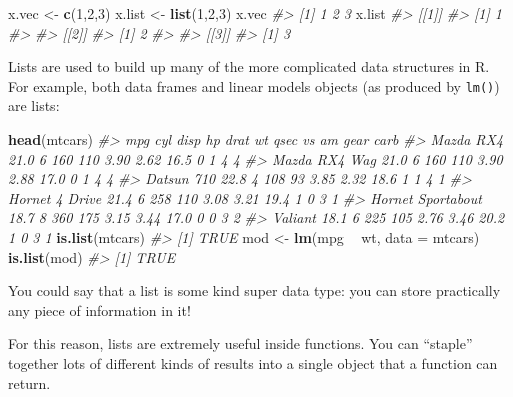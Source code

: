 \documentclass[]{book}
\newenvironment{Shaded}{\begin{snugshade}}{\end{snugshade}}
\newcommand{\CommentTok}[1]{\textcolor[rgb]{0.56,0.35,0.01}{\textit{#1}}}
\newcommand{\DataTypeTok}[1]{\textcolor[rgb]{0.13,0.29,0.53}{#1}}
\newcommand{\DecValTok}[1]{\textcolor[rgb]{0.00,0.00,0.81}{#1}}
\newcommand{\KeywordTok}[1]{\textcolor[rgb]{0.13,0.29,0.53}{\textbf{#1}}}
\newcommand{\NormalTok}[1]{#1}
\newcommand{\OperatorTok}[1]{\textcolor[rgb]{0.81,0.36,0.00}{\textbf{#1}}}
\newcommand{\StringTok}[1]{\textcolor[rgb]{0.31,0.60,0.02}{#1}}
\begin{document}
\begin{Shaded}
\begin{Highlighting}[]
\NormalTok{x.vec <-}\StringTok{ }\KeywordTok{c}\NormalTok{(}\DecValTok{1}\NormalTok{,}\DecValTok{2}\NormalTok{,}\DecValTok{3}\NormalTok{)}
\NormalTok{x.list <-}\StringTok{ }\KeywordTok{list}\NormalTok{(}\DecValTok{1}\NormalTok{,}\DecValTok{2}\NormalTok{,}\DecValTok{3}\NormalTok{)}
\NormalTok{x.vec}
\CommentTok{#> [1] 1 2 3}
\NormalTok{x.list}
\CommentTok{#> [[1]]}
\CommentTok{#> [1] 1}
\CommentTok{#> }
\CommentTok{#> [[2]]}
\CommentTok{#> [1] 2}
\CommentTok{#> }
\CommentTok{#> [[3]]}
\CommentTok{#> [1] 3}
\end{Highlighting}
\end{Shaded}

Lists are used to build up many of the more complicated data structures in R. For example, both data frames and linear models objects (as produced by \texttt{lm()}) are lists:

\begin{Shaded}
\begin{Highlighting}[]
\KeywordTok{head}\NormalTok{(mtcars)}
\CommentTok{#>                    mpg cyl disp  hp drat   wt qsec vs am gear carb}
\CommentTok{#> Mazda RX4         21.0   6  160 110 3.90 2.62 16.5  0  1    4    4}
\CommentTok{#> Mazda RX4 Wag     21.0   6  160 110 3.90 2.88 17.0  0  1    4    4}
\CommentTok{#> Datsun 710        22.8   4  108  93 3.85 2.32 18.6  1  1    4    1}
\CommentTok{#> Hornet 4 Drive    21.4   6  258 110 3.08 3.21 19.4  1  0    3    1}
\CommentTok{#> Hornet Sportabout 18.7   8  360 175 3.15 3.44 17.0  0  0    3    2}
\CommentTok{#> Valiant           18.1   6  225 105 2.76 3.46 20.2  1  0    3    1}
\KeywordTok{is.list}\NormalTok{(mtcars)}
\CommentTok{#> [1] TRUE}
\NormalTok{mod <-}\StringTok{ }\KeywordTok{lm}\NormalTok{(mpg }\OperatorTok{~}\StringTok{ }\NormalTok{wt, }\DataTypeTok{data =}\NormalTok{ mtcars)}
\KeywordTok{is.list}\NormalTok{(mod)}
\CommentTok{#> [1] TRUE}
\end{Highlighting}
\end{Shaded}

You could say that a list is some kind super data type: you can store practically any piece of information in it!

For this reason, lists are extremely useful inside functions. You can ``staple'' together lots of different kinds of results into a single object that a function can return.
\end{document}
